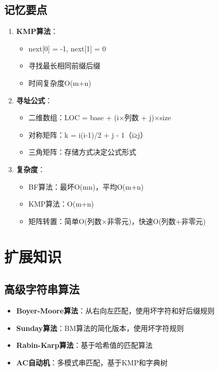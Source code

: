 \documentclass[12pt,a4paper]{amsart}
\begin{document}
\subsection{记忆要点}
\begin{enumerate}
\item \textbf{KMP算法}：
    \begin{itemize}
    \item next[0] = -1, next[1] = 0
    \item 寻找最长相同前缀后缀
    \item 时间复杂度O(m+n)
    \end{itemize}
    
\item \textbf{寻址公式}：
    \begin{itemize}
    \item 二维数组：LOC = base + (i×列数 + j)×size
    \item 对称矩阵：k = i(i-1)/2 + j - 1（i≥j）
    \item 三角矩阵：存储方式决定公式形式
    \end{itemize}
    
\item \textbf{复杂度}：
    \begin{itemize}
    \item BF算法：最坏O(mn)，平均O(m+n)
    \item KMP算法：O(m+n)
    \item 矩阵转置：简单O(列数×非零元)，快速O(列数+非零元)
    \end{itemize}
\end{enumerate}

\section{扩展知识}

\subsection{高级字符串算法}
\begin{itemize}
\item \textbf{Boyer-Moore算法}：从右向左匹配，使用坏字符和好后缀规则
\item \textbf{Sunday算法}：BM算法的简化版本，使用坏字符规则
\item \textbf{Rabin-Karp算法}：基于哈希值的匹配算法
\item \textbf{AC自动机}：多模式串匹配，基于KMP和字典树
\end{itemize}
\end{document}
